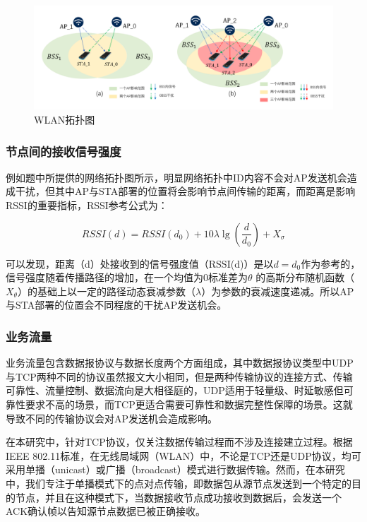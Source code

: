 \documentclass[bwprint]{gmcmthesis}
\begin{document}
\begin{figure}[H]
	\centering
	\includegraphics[width=1\linewidth]{figures/阔谱图}
	\caption{WLAN拓扑图}
	\label{fig:}
\end{figure}




\subsubsection{节点间的接收信号强度}

例如题中所提供的网络拓扑图所示，明显网络拓扑中ID内容不会对AP发送机会造成干扰，但其中AP与STA部署的位置将会影响节点间传输的距离，而距离是影响RSSI的重要指标，RSSI参考公式为：

\begin{equation}
	RSSI\left( d \right) =RSSI\left( d_0 \right) +10\lambda \lg \left( \frac{d}{d_0} \right) +X_{\sigma}
\end{equation}

可以发现，距离（d）处接收到的信号强度值（RSSI(d)）是以$d=d_0$作为参考的，信号强度随着传播路径的增加，在一个均值为0标准差为$ \theta $ 的高斯分布随机函数（$X_{ \theta }$）的基础上以一定的路径动态衰减参数（$ \lambda $）为参数的衰减速度递减。所以AP与STA部署的位置会不同程度的干扰AP发送机会。

\subsubsection{业务流量}

业务流量包含数据报协议与数据长度两个方面组成，其中数据报协议类型中UDP与TCP两种不同的协议虽然报文大小相同，但是两种传输协议的连接方式、传输可靠性、流量控制、数据流向是大相径庭的，UDP适用于轻量级、时延敏感但可靠性要求不高的场景，而TCP更适合需要可靠性和数据完整性保障的场景。这就导致不同的传输协议会对AP发送机会造成影响。

在本研究中，针对TCP协议，仅关注数据传输过程而不涉及连接建立过程。根据IEEE 802.11标准，在无线局域网（WLAN）中，不论是TCP还是UDP协议，均可采用单播（unicast）或广播（broadcast）模式进行数据传输。然而，在本研究中，我们专注于单播模式下的点对点传输，即数据包从源节点发送到一个特定的目的节点，并且在这种模式下，当数据接收节点成功接收到数据后，会发送一个ACK确认帧以告知源节点数据已被正确接收。
\end{document}
